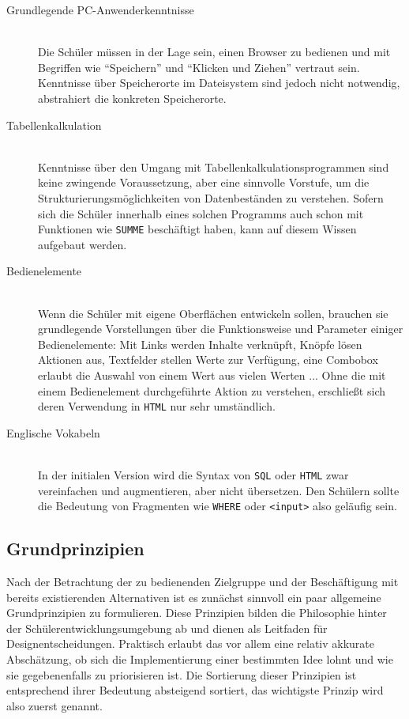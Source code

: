 \begin{description}
\item[Grundlegende PC-Anwenderkenntnisse] \hfill\\
  Die Schüler müssen in der Lage sein, einen Browser zu bedienen und mit Begriffen wie "`Speichern"' und "`Klicken und Ziehen"' vertraut sein. Kenntnisse über Speicherorte im Dateisystem sind jedoch nicht notwendig, \idename{} abstrahiert die konkreten Speicherorte.
\item[Tabellenkalkulation] \hfill\\
  Kenntnisse über den Umgang mit Tabellenkalkulationsprogrammen sind keine zwingende Voraussetzung, aber eine sinnvolle Vorstufe, um die Strukturierungsmöglichkeiten von Datenbeständen zu verstehen. Sofern sich die Schüler innerhalb eines solchen Programms auch schon mit Funktionen wie \texttt{SUMME} beschäftigt haben, kann auf diesem Wissen aufgebaut werden.
\item[Bedienelemente] \hfill\\
  Wenn die Schüler mit \idename{} eigene Oberflächen entwickeln sollen, brauchen sie grundlegende Vorstellungen über die Funktionsweise und Parameter einiger Bedienelemente: Mit Links werden Inhalte verknüpft, Knöpfe lösen Aktionen aus, Textfelder stellen Werte zur Verfügung, eine Combobox erlaubt die Auswahl von einem Wert aus vielen Werten ... Ohne die mit einem Bedienelement durchgeführte Aktion zu verstehen, erschließt sich deren Verwendung in \texttt{HTML} nur sehr umständlich.
\item[Englische Vokabeln] \hfill\\
  In der initialen Version wird \idename{} die Syntax von \texttt{SQL} oder \texttt{HTML} zwar vereinfachen und augmentieren, aber nicht übersetzen. Den Schülern sollte die Bedeutung von Fragmenten wie \texttt{WHERE} oder \texttt{<input>} also geläufig sein.
\end{description}

\subsection{Grundprinzipien}
\label{sec:principles}

Nach der Betrachtung der zu bedienenden Zielgruppe und der Beschäftigung mit bereits existierenden Alternativen ist es zunächst sinnvoll ein paar allgemeine Grundprinzipien zu formulieren. Diese Prinzipien bilden die Philosophie hinter der Schülerentwicklungsumgebung ab und dienen als Leitfaden für Designentscheidungen. Praktisch erlaubt das vor allem eine relativ akkurate Abschätzung, ob sich die Implementierung einer bestimmten Idee lohnt und wie sie gegebenenfalls zu priorisieren ist. Die Sortierung dieser Prinzipien ist entsprechend ihrer Bedeutung absteigend sortiert, das wichtigste Prinzip wird also zuerst genannt.

